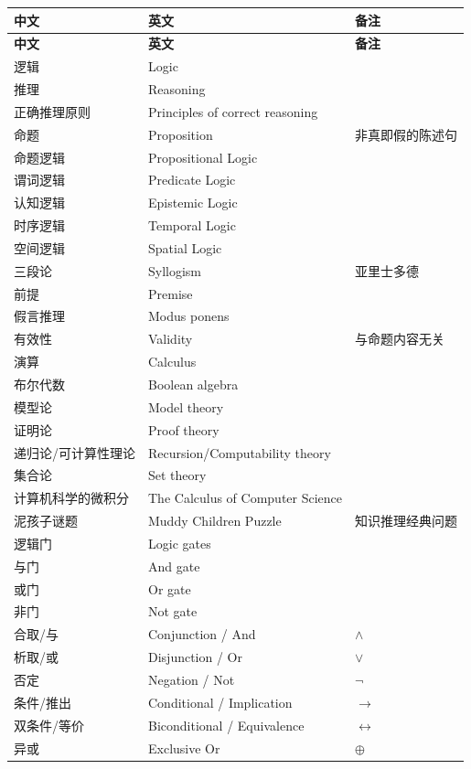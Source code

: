 \documentclass[UTF8,11pt,a4paper]{ctexbook}   %
\theoremstyle{definition}
\begin{document}
\footnotesize
\begin{longtable}{|p{4.8cm}|p{4.8cm}|p{4.8cm}|}
\hline
\textbf{中文} & \textbf{英文} & \textbf{备注} \\ \hline
\endfirsthead
\hline
\textbf{中文} & \textbf{英文} & \textbf{备注} \\ \hline
\endhead
逻辑 & Logic & \\
推理 & Reasoning & \\
正确推理原则 & Principles of correct reasoning & \\
命题 & Proposition & 非真即假的陈述句 \\
命题逻辑 & Propositional Logic & \\
谓词逻辑 & Predicate Logic & \\
认知逻辑 & Epistemic Logic & \\
时序逻辑 & Temporal Logic & \\
空间逻辑 & Spatial Logic & \\
三段论 & Syllogism & 亚里士多德 \\
前提 & Premise & \\
假言推理 & Modus ponens & \\
有效性 & Validity & 与命题内容无关 \\
演算 & Calculus & \\
布尔代数 & Boolean algebra & \\
模型论 & Model theory & \\
证明论 & Proof theory & \\
递归论/可计算性理论 & Recursion/Computability theory & \\
集合论 & Set theory & \\
计算机科学的微积分 & The Calculus of Computer Science & \\
泥孩子谜题 & Muddy Children Puzzle & 知识推理经典问题 \\
逻辑门 & Logic gates & \\
与门 & And gate & \\
或门 & Or gate & \\
非门 & Not gate & \\
合取/与 & Conjunction / And & $\land$ \\
析取/或 & Disjunction / Or & $\lor$ \\
否定 & Negation / Not & $\neg$ \\
条件/推出 & Conditional / Implication & $\rightarrow$ \\
双条件/等价 & Biconditional / Equivalence & $\leftrightarrow$ \\
异或 & Exclusive Or & $\oplus$ \\

\end{longtable}
\end{document}

